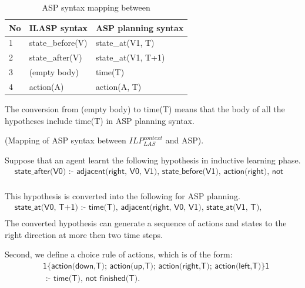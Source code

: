 \begin{table}[H]
\centering
\begin{tabular}{|l|p{5cm}|p{5cm}|}
\hline
No & ILASP syntax & ASP planning syntax\\ \hline
1 & \textsf{state\_before(V)} & \textsf{state\_at(V1, T)}  \\ \hline
2 & \textsf{state\_after(V)} & \textsf{state\_at(V1, T+1)}  \\ \hline
3 & \textsf{(empty body)} & \textsf{time(T)}  \\ \hline
4 & \textsf{action(A)} & \textsf{action(A, T)}  \\ \hline
\end{tabular}
\caption{ASP syntax mapping between }
\label{table:extension_specification}
\end{table}
The conversion from (empty body) to \textsf{time(T)} means that the body of all the hypotheses include \textsf{time(T)} in ASP planning syntax.
\begin{examp} \normalfont (Mapping of ASP syntax between $ILP_{LAS}^{context}$ and ASP).

Suppose that an agent learnt the following hypothesis in inductive learning phase. 
\begin{equation*}
\begin{split}
&\textsf{state\_after(V0) :- adjacent(right, V0, V1), state\_before(V1), action(right), not wall(V0).}\\
\end{split}
\end{equation*}

This hypothesis is converted into the following for ASP planning.
\begin{equation*}
\begin{split}
&\textsf{state\_at(V0, T+1) :- time(T), adjacent(right, V0, V1), state\_at(V1, T), action(right, T), not wall(V0).}\\
\end{split}
\end{equation*}
The converted hypothesis can generate a sequence of actions and states to the right direction at more then two time steps.
\end{examp}

Second, we define a choice rule of actions, which is of the form:
\begin{equation}\label{eq:choice_rule}
\begin{split}
&\textsf{1\{action(down,T); action(up,T); action(right,T); action(left,T)\}1} \\
&\textsf{ :- time(T), not finished(T).}\\
\end{split}
\end{equation}

